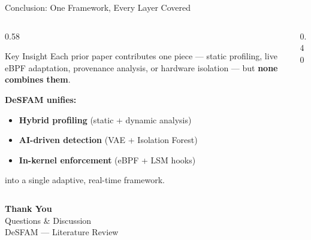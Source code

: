 \documentclass[aspectratio=169,11pt]{beamer}
\begin{document}
\begin{frame}{Conclusion: One Framework, Every Layer Covered}
\begin{columns}[T,onlytextwidth]
\begin{column}{0.58\textwidth}
\begin{block}{Key Insight}
Each prior paper contributes one piece --- static profiling, live eBPF adaptation, provenance analysis, or hardware isolation --- but \textbf{none combines them}.
\end{block}

\vspace{0.25cm}
\textbf{DeSFAM unifies:}
\begin{itemize}
  \item \textbf{Hybrid profiling} (static + dynamic analysis)
  \item \textbf{AI-driven detection} (VAE + Isolation Forest)
  \item \textbf{In-kernel enforcement} (eBPF + LSM hooks)
\end{itemize}

\vspace{0.2cm}
{\small into a single adaptive, real-time framework.}
\end{column}

\begin{column}{0.40\textwidth}
\centering
\vspace{0.3cm}
\end{column}
\end{columns}
\end{frame}

{
\begin{frame}[plain]

\vfill
\begin{center}
{\Huge\bfseries\textcolor{SJCETblue}{Thank You}}\\[0.6cm]
{\large Questions \& Discussion}\\[0.3cm]
{\normalsize\textcolor{SJCETgold}{DeSFAM --- Literature Review}}
\end{center}
\vfill

\end{frame}
}

\end{document}
